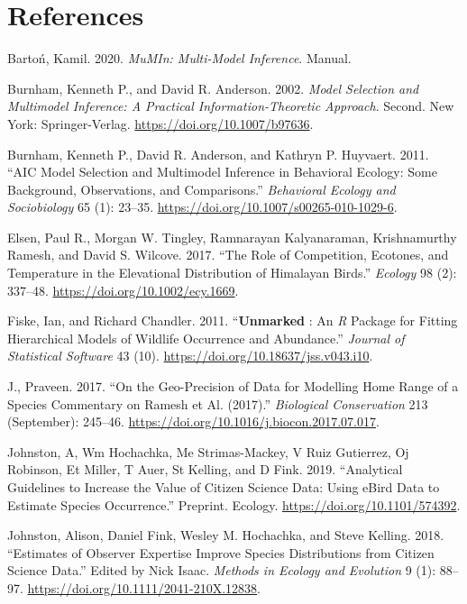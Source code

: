 \documentclass[]{article}
\begin{document}
\clearpage

\hypertarget{references}{%
\section{References}\label{references}}

\hypertarget{refs}{}
\leavevmode\hypertarget{ref-MuMIn}{}%
Bartoń, Kamil. 2020. \emph{MuMIn: Multi-Model Inference}. Manual.

\leavevmode\hypertarget{ref-burnham2002a}{}%
Burnham, Kenneth P., and David R. Anderson. 2002. \emph{Model Selection and Multimodel Inference: A Practical Information-Theoretic Approach}. Second. New York: Springer-Verlag. \url{https://doi.org/10.1007/b97636}.

\leavevmode\hypertarget{ref-burnham2011}{}%
Burnham, Kenneth P., David R. Anderson, and Kathryn P. Huyvaert. 2011. ``AIC Model Selection and Multimodel Inference in Behavioral Ecology: Some Background, Observations, and Comparisons.'' \emph{Behavioral Ecology and Sociobiology} 65 (1): 23--35. \url{https://doi.org/10.1007/s00265-010-1029-6}.

\leavevmode\hypertarget{ref-elsen2017}{}%
Elsen, Paul R., Morgan W. Tingley, Ramnarayan Kalyanaraman, Krishnamurthy Ramesh, and David S. Wilcove. 2017. ``The Role of Competition, Ecotones, and Temperature in the Elevational Distribution of Himalayan Birds.'' \emph{Ecology} 98 (2): 337--48. \url{https://doi.org/10.1002/ecy.1669}.

\leavevmode\hypertarget{ref-fiske2011}{}%
Fiske, Ian, and Richard Chandler. 2011. ``\textbf{Unmarked} : An \emph{R} Package for Fitting Hierarchical Models of Wildlife Occurrence and Abundance.'' \emph{Journal of Statistical Software} 43 (10). \url{https://doi.org/10.18637/jss.v043.i10}.

\leavevmode\hypertarget{ref-praveenj.2017}{}%
J., Praveen. 2017. ``On the Geo-Precision of Data for Modelling Home Range of a Species Commentary on Ramesh et Al. (2017).'' \emph{Biological Conservation} 213 (September): 245--46. \url{https://doi.org/10.1016/j.biocon.2017.07.017}.

\leavevmode\hypertarget{ref-johnston2019a}{}%
Johnston, A, Wm Hochachka, Me Strimas-Mackey, V Ruiz Gutierrez, Oj Robinson, Et Miller, T Auer, St Kelling, and D Fink. 2019. ``Analytical Guidelines to Increase the Value of Citizen Science Data: Using eBird Data to Estimate Species Occurrence.'' Preprint. Ecology. \url{https://doi.org/10.1101/574392}.

\leavevmode\hypertarget{ref-johnston2018}{}%
Johnston, Alison, Daniel Fink, Wesley M. Hochachka, and Steve Kelling. 2018. ``Estimates of Observer Expertise Improve Species Distributions from Citizen Science Data.'' Edited by Nick Isaac. \emph{Methods in Ecology and Evolution} 9 (1): 88--97. \url{https://doi.org/10.1111/2041-210X.12838}.
\end{document}
